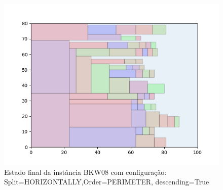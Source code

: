\begin{figure}[H]
    \centering
    \caption[]{Estado final da instância BKW08 com configuração: Split=HORIZONTALLY,Order=PERIMETER, descending=True}
    \label{fig:bkw08-horizontally-perimeter-true}
    \includegraphics[scale=0.5]{output/figures/bkw/bkw08/horizontally/perimeter/true/00}
\end{figure}